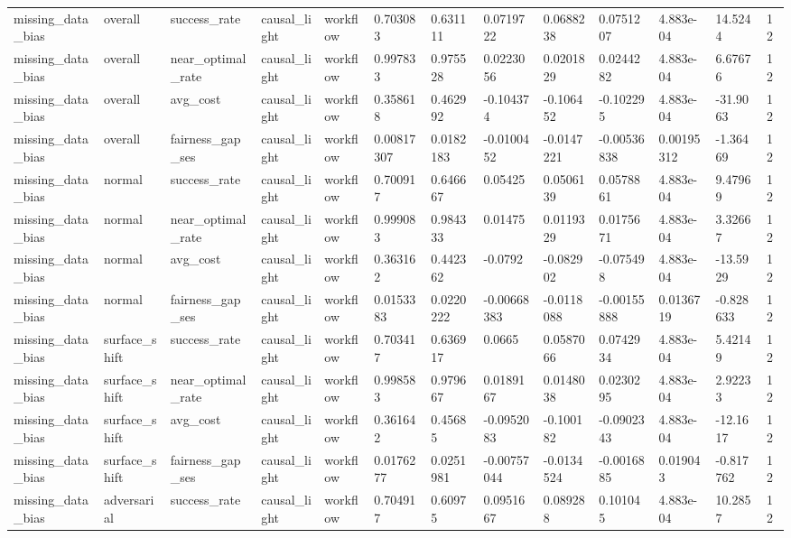 \begin{tabular}{lllllllllllll}
missing\_data\_bias & overall & success\_rate & causal\_light & workflow & 0.703083 & 0.631111 & 0.0719722 & 0.0688238 & 0.0751207 & 4.883e-04 & 14.5244 & 12 \\
missing\_data\_bias & overall & near\_optimal\_rate & causal\_light & workflow & 0.997833 & 0.975528 & 0.0223056 & 0.0201829 & 0.0244282 & 4.883e-04 & 6.67676 & 12 \\
missing\_data\_bias & overall & avg\_cost & causal\_light & workflow & 0.358618 & 0.462992 & -0.104374 & -0.106452 & -0.102295 & 4.883e-04 & -31.9063 & 12 \\
missing\_data\_bias & overall & fairness\_gap\_ses & causal\_light & workflow & 0.00817307 & 0.0182183 & -0.0100452 & -0.0147221 & -0.00536838 & 0.00195312 & -1.36469 & 12 \\
missing\_data\_bias & normal & success\_rate & causal\_light & workflow & 0.700917 & 0.646667 & 0.05425 & 0.0506139 & 0.0578861 & 4.883e-04 & 9.47969 & 12 \\
missing\_data\_bias & normal & near\_optimal\_rate & causal\_light & workflow & 0.999083 & 0.984333 & 0.01475 & 0.0119329 & 0.0175671 & 4.883e-04 & 3.32667 & 12 \\
missing\_data\_bias & normal & avg\_cost & causal\_light & workflow & 0.363162 & 0.442362 & -0.0792 & -0.082902 & -0.075498 & 4.883e-04 & -13.5929 & 12 \\
missing\_data\_bias & normal & fairness\_gap\_ses & causal\_light & workflow & 0.0153383 & 0.0220222 & -0.00668383 & -0.0118088 & -0.00155888 & 0.0136719 & -0.828633 & 12 \\
missing\_data\_bias & surface\_shift & success\_rate & causal\_light & workflow & 0.703417 & 0.636917 & 0.0665 & 0.0587066 & 0.0742934 & 4.883e-04 & 5.42149 & 12 \\
missing\_data\_bias & surface\_shift & near\_optimal\_rate & causal\_light & workflow & 0.998583 & 0.979667 & 0.0189167 & 0.0148038 & 0.0230295 & 4.883e-04 & 2.92233 & 12 \\
missing\_data\_bias & surface\_shift & avg\_cost & causal\_light & workflow & 0.361642 & 0.45685 & -0.0952083 & -0.100182 & -0.0902343 & 4.883e-04 & -12.1617 & 12 \\
missing\_data\_bias & surface\_shift & fairness\_gap\_ses & causal\_light & workflow & 0.0176277 & 0.0251981 & -0.00757044 & -0.0134524 & -0.0016885 & 0.019043 & -0.817762 & 12 \\
missing\_data\_bias & adversarial & success\_rate & causal\_light & workflow & 0.704917 & 0.60975 & 0.0951667 & 0.089288 & 0.101045 & 4.883e-04 & 10.2857 & 12 \\

\end{tabular}

